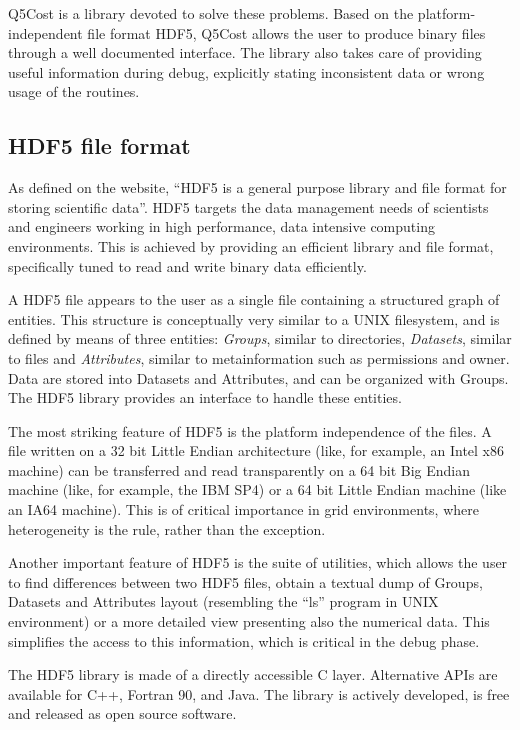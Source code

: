 Q5Cost is a library devoted to solve these problems. Based on the
{platform-independent} file format HDF5, Q5Cost allows the user to produce binary
files through a well documented interface. The library also takes care of
providing useful information during debug, explicitly stating inconsistent
data or wrong usage of the routines.

\subsection*{HDF5 file format}

As defined on the website\cite{hdf5-site}, ``HDF5 is a general purpose library and file
format for storing scientific data''. HDF5 targets the data management needs
of scientists and engineers working in high performance, data intensive
computing environments. This is achieved by providing an efficient library and
file format, specifically tuned to read and write binary data efficiently.

A HDF5 file appears to the user as a single file containing a structured
graph of entities. This structure is conceptually very similar to a UNIX
filesystem, and is defined by means of three entities: \textit{Groups},
similar to directories, \textit{Datasets}, similar to files
and \textit{Attributes}, similar to metainformation such as permissions and
owner.  Data are stored into Datasets and Attributes, and can be organized
with Groups. The HDF5 library provides an interface to handle these
entities.

The most striking feature of HDF5 is the platform independence of the files.
A file written on a 32 bit Little Endian architecture (like, for example, an
Intel x86 machine) can be transferred and read transparently on a 64 bit Big
Endian machine (like, for example, the IBM SP4) or a 64 bit Little Endian
machine (like an IA64 machine). This is of critical importance
in grid environments, where heterogeneity is the rule, rather than the
exception.

Another important feature of HDF5 is the suite of utilities, which allows the
user to find differences between two HDF5 files, obtain a textual dump of
Groups, Datasets and Attributes layout (resembling the ``ls'' program in
UNIX environment) or a more detailed view presenting also the numerical
data.  This simplifies the access to this information, which is critical
in the debug phase.

The HDF5 library is made of a directly accessible C layer. Alternative APIs
are available for C++, Fortran 90, and Java. The library is actively
developed, is free and released as open source software.

